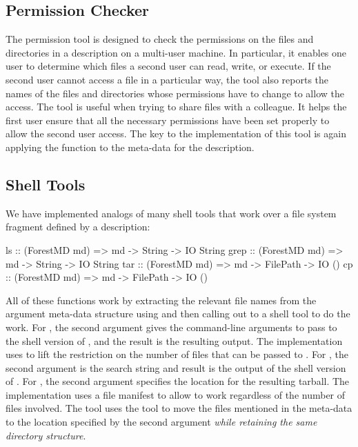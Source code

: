 \subsection{Permission Checker}
The permission tool is designed to check the permissions on the files
and directories in a \forest{} description on a multi-user machine.
In particular, it enables one user to determine which files a second
user can read, write, or execute.  If the second user cannot access a
file in a particular way, the tool also reports the names of the files
and directories whose permissions have to change to allow the access.
The tool is useful when trying to share files with a colleague.  It
helps the first user ensure that all the necessary permissions
have been set properly to allow the second user access.  The key to
the implementation of this tool is again applying the 
function to the meta-data for the \forest{} description.

\subsection{Shell Tools}
We have implemented analogs of many shell tools that work
over a file system fragment defined by a
\forest{} description:
\begin{code}
ls    :: (ForestMD md) => md -> String -> IO String
grep  :: (ForestMD md) => md -> String -> IO String
tar   :: (ForestMD md) => md -> FilePath -> IO ()
cp    :: (ForestMD md) => md -> FilePath -> IO ()
\end{code}
All of these functions work by extracting the relevant file names from
the argument meta-data structure using  and then calling
out to a shell tool to do the work.  For , the second argument
gives the command-line arguments to pass to the shell version of
, and the result is the resulting output. The implementation
uses  to lift the restriction on the number of files that can
be passed to . For , the second argument is the 
search string and result is the output of the shell version of . For
, the second argument specifies the location for the resulting
tarball.  The implementation uses a file manifest to allow  to
work regardless of the number of files involved.  The  tool
uses the  tool to move the files mentioned in the meta-data to
the location specified by the second argument \textit{while retaining
the same directory structure}.   

